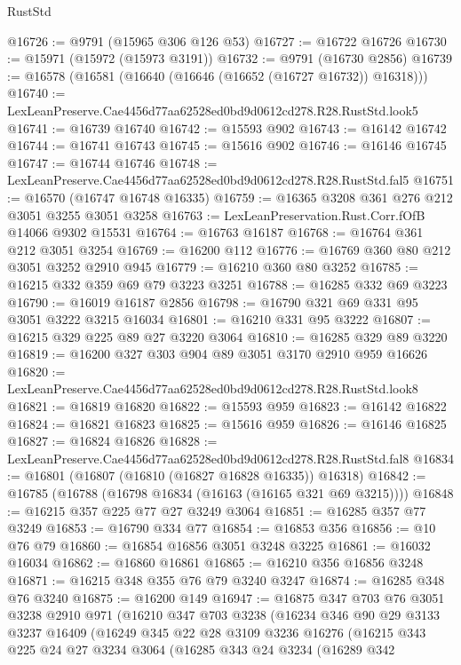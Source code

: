 \begin{lexlean}{RustStd}
\begin{coremodule}
@16726 := @9791 (@15965 @306 @126 @53)
@16727 := @16722 @16726
@16730 := @15971 (@15972 (@15973 @3191))
@16732 := @9791 (@16730 @2856)
@16739 := @16578 (@16581 (@16640 (@16646 (@16652 (@16727 @16732)) @16318)))
@16740 := LexLeanPreserve.Cae4456d77aa62528ed0bd9d0612cd278.R28.RustStd.look5
@16741 := @16739 @16740
@16742 := @15593 @902
@16743 := @16142 @16742
@16744 := @16741 @16743
@16745 := @15616 @902
@16746 := @16146 @16745
@16747 := @16744 @16746
@16748 := LexLeanPreserve.Cae4456d77aa62528ed0bd9d0612cd278.R28.RustStd.fal5
@16751 := @16570 (@16747 @16748 @16335)
@16759 := @16365 @3208 @361 @276 @212 @3051 @3255 @3051 @3258
@16763 := LexLeanPreservation.Rust.Corr.fOfB @14066 @9302 @15531
@16764 := @16763 @16187
@16768 := @16764 @361 @212 @3051 @3254
@16769 := @16200 @112
@16776 := @16769 @360 @80 @212 @3051 @3252 @2910 @945
@16779 := @16210 @360 @80 @3252
@16785 := @16215 @332 @359 @69 @79 @3223 @3251
@16788 := @16285 @332 @69 @3223
@16790 := @16019 @16187 @2856
@16798 := @16790 @321 @69 @331 @95 @3051 @3222 @3215 @16034
@16801 := @16210 @331 @95 @3222
@16807 := @16215 @329 @225 @89 @27 @3220 @3064
@16810 := @16285 @329 @89 @3220
@16819 := @16200 @327 @303 @904 @89 @3051 @3170 @2910 @959 @16626
@16820 := LexLeanPreserve.Cae4456d77aa62528ed0bd9d0612cd278.R28.RustStd.look8
@16821 := @16819 @16820
@16822 := @15593 @959
@16823 := @16142 @16822
@16824 := @16821 @16823
@16825 := @15616 @959
@16826 := @16146 @16825
@16827 := @16824 @16826
@16828 := LexLeanPreserve.Cae4456d77aa62528ed0bd9d0612cd278.R28.RustStd.fal8
@16834 := @16801 (@16807 (@16810 (@16827 @16828 @16335)) @16318)
@16842 := @16785 (@16788 (@16798 @16834 (@16163 (@16165 @321 @69 @3215))))
@16848 := @16215 @357 @225 @77 @27 @3249 @3064
@16851 := @16285 @357 @77 @3249
@16853 := @16790 @334 @77
@16854 := @16853 @356
@16856 := @10 @76 @79
@16860 := @16854 @16856 @3051 @3248 @3225
@16861 := @16032 @16034
@16862 := @16860 @16861
@16865 := @16210 @356 @16856 @3248
@16871 := @16215 @348 @355 @76 @79 @3240 @3247
@16874 := @16285 @348 @76 @3240
@16875 := @16200 @149
@16947 := @16875
    @347
    @703
    @76
    @3051
    @3238
    @2910
    @971
    (@16210
      @347
      @703
      @3238
      (@16234
        @346
        @90
        @29
        @3133
        @3237
        @16409
        (@16249
          @345
          @22
          @28
          @3109
          @3236
          @16276
          (@16215
            @343
            @225
            @24
            @27
            @3234
            @3064
            (@16285
              @343
              @24
              @3234
              (@16289
                @342

\end{coremodule}
\end{lexlean}
